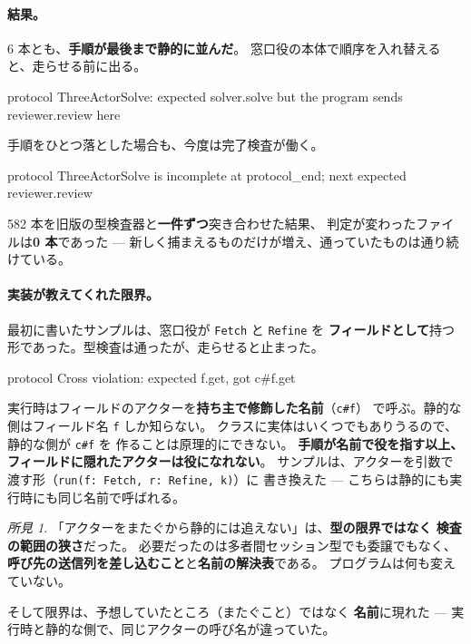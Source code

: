 \documentclass[11pt,a4paper]{ltjsarticle}
\theoremstyle{definition}
\theoremstyle{remark}
\newtheorem{finding}[theorem]{所見}
\begin{document}
\paragraph{結果。}
6 本とも、\textbf{手順が最後まで静的に並んだ}。
窓口役の本体で順序を入れ替えると、走らせる前に出る。

\begin{term}
 protocol ThreeActorSolve: expected solver.solve
             but the program sends reviewer.review here
\end{term}

手順をひとつ落とした場合も、今度は完了検査が働く。

\begin{term}
 protocol ThreeActorSolve is incomplete at protocol_end;
             next expected reviewer.review
\end{term}

582 本を旧版の型検査器と\textbf{一件ずつ}突き合わせた結果、
判定が変わったファイルは\textbf{0 本}であった ---
新しく捕まえるものだけが増え、通っていたものは通り続けている。

\paragraph{実装が教えてくれた限界。}
最初に書いたサンプルは、窓口役が \texttt{Fetch} と \texttt{Refine} を
\textbf{フィールドとして}持つ形であった。型検査は通ったが、走らせると止まった。

\begin{term}
protocol Cross violation: expected f.get, got c#f.get
\end{term}

実行時はフィールドのアクターを\textbf{持ち主で修飾した名前}（\texttt{c\#f}）
で呼ぶ。静的な側はフィールド名 \texttt{f} しか知らない。
クラスに実体はいくつでもありうるので、静的な側が \texttt{c\#f} を
作ることは原理的にできない。
\textbf{手順が名前で役を指す以上、フィールドに隠れたアクターは役になれない}。
サンプルは、アクターを引数で渡す形（\texttt{run(f: Fetch, r: Refine, k)}）に
書き換えた --- こちらは静的にも実行時にも同じ名前で呼ばれる。

\begin{finding}
「アクターをまたぐから静的には追えない」は、\textbf{型の限界ではなく
検査の範囲の狭さ}だった。
必要だったのは多者間セッション型でも委譲でもなく、
\textbf{呼び先の送信列を差し込むこと}と\textbf{名前の解決表}である。
プログラムは何も変えていない。

そして限界は、予想していたところ（またぐこと）ではなく
\textbf{名前}に現れた ---
実行時と静的な側で、同じアクターの呼び名が違っていた。
\end{finding}
\end{document}
